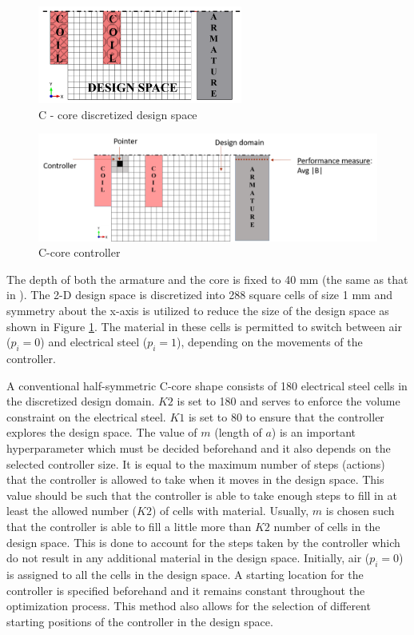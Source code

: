\begin{figure}[h!]
    \centering
    \includegraphics[width=0.60\textwidth]{Figures/Ch_MDP/c_core_half.png}
    \caption{C - core discretized design space}
    \label{fig:MDP_c_core_half}
\end{figure}

\begin{figure}[h!]
    \centering
    \includegraphics[width=\textwidth]{Figures/Ch_MDP/C_core_controller.png}
    \caption{C-core controller}
    \label{fig:MDP_c_core_controller}
\end{figure}

The depth of both the armature and the core is fixed to 40 mm (the same as that in \parencite{midha2019selection}). The 2-D design space is discretized into 288 square cells of size 1 mm and symmetry about the x-axis is utilized to reduce the size of the design space as shown in Figure \ref{fig:MDP_c_core_half}. The material in these cells is permitted to switch between air ($p_i=0$) and electrical steel ($p_i=1$), depending on the movements of the controller.

A conventional half-symmetric C-core shape consists of 180 electrical steel cells in the discretized design domain. $K2$ is set to 180 and serves to enforce the volume constraint on the electrical steel. $K1$ is set to 80 to ensure that the controller explores the design space. The value of $m$ (length of $a$) is an important hyperparameter which must be decided beforehand and it also depends on the selected controller size. It is equal to the maximum number of steps (actions) that the controller is allowed to take when it moves in the design space. This value should be such that the controller is able to take enough steps to fill in at least the allowed number ($K2$) of cells with material. Usually, $m$ is chosen such that the controller is able to fill a little more than $K2$ number of cells in the design space. This is done to account for the steps taken by the controller which do not result in any additional material in the design space. Initially, air ($p_i=0$) is assigned to all the cells in the design space. A starting location for the controller is specified beforehand and it remains constant throughout the optimization process. This method also allows for the selection of different starting positions of the controller in the design space.

